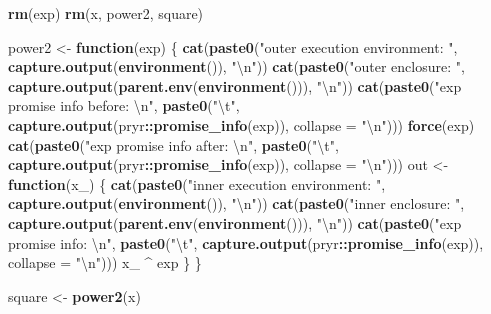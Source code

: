 \documentclass[]{book}
\newenvironment{Shaded}{\begin{snugshade}}{\end{snugshade}}
\newcommand{\CharTok}[1]{\textcolor[rgb]{0.31,0.60,0.02}{#1}}
\newcommand{\ControlFlowTok}[1]{\textcolor[rgb]{0.13,0.29,0.53}{\textbf{#1}}}
\newcommand{\DataTypeTok}[1]{\textcolor[rgb]{0.13,0.29,0.53}{#1}}
\newcommand{\KeywordTok}[1]{\textcolor[rgb]{0.13,0.29,0.53}{\textbf{#1}}}
\newcommand{\NormalTok}[1]{#1}
\newcommand{\OperatorTok}[1]{\textcolor[rgb]{0.81,0.36,0.00}{\textbf{#1}}}
\newcommand{\StringTok}[1]{\textcolor[rgb]{0.31,0.60,0.02}{#1}}
\begin{document}
\begin{Shaded}
\begin{Highlighting}[]
\KeywordTok{rm}\NormalTok{(exp)}
\KeywordTok{rm}\NormalTok{(x, power2, square)}

\NormalTok{power2 <-}\StringTok{ }\ControlFlowTok{function}\NormalTok{(exp) \{}
  \KeywordTok{cat}\NormalTok{(}\KeywordTok{paste0}\NormalTok{(}\StringTok{"outer execution environment: "}\NormalTok{, }\KeywordTok{capture.output}\NormalTok{(}\KeywordTok{environment}\NormalTok{()), }\StringTok{"}\CharTok{\textbackslash{}n}\StringTok{"}\NormalTok{))}
  \KeywordTok{cat}\NormalTok{(}\KeywordTok{paste0}\NormalTok{(}\StringTok{"outer enclosure: "}\NormalTok{, }\KeywordTok{capture.output}\NormalTok{(}\KeywordTok{parent.env}\NormalTok{(}\KeywordTok{environment}\NormalTok{())), }\StringTok{"}\CharTok{\textbackslash{}n}\StringTok{"}\NormalTok{))}
  \KeywordTok{cat}\NormalTok{(}\KeywordTok{paste0}\NormalTok{(}\StringTok{"exp promise info before: }\CharTok{\textbackslash{}n}\StringTok{"}\NormalTok{, }\KeywordTok{paste0}\NormalTok{(}\StringTok{"}\CharTok{\textbackslash{}t}\StringTok{"}\NormalTok{, }\KeywordTok{capture.output}\NormalTok{(pryr}\OperatorTok{::}\KeywordTok{promise_info}\NormalTok{(exp)), }\DataTypeTok{collapse =} \StringTok{"}\CharTok{\textbackslash{}n}\StringTok{"}\NormalTok{)))}
  \KeywordTok{force}\NormalTok{(exp)}
  \KeywordTok{cat}\NormalTok{(}\KeywordTok{paste0}\NormalTok{(}\StringTok{"exp promise info after: }\CharTok{\textbackslash{}n}\StringTok{"}\NormalTok{, }\KeywordTok{paste0}\NormalTok{(}\StringTok{"}\CharTok{\textbackslash{}t}\StringTok{"}\NormalTok{, }\KeywordTok{capture.output}\NormalTok{(pryr}\OperatorTok{::}\KeywordTok{promise_info}\NormalTok{(exp)), }\DataTypeTok{collapse =} \StringTok{"}\CharTok{\textbackslash{}n}\StringTok{"}\NormalTok{)))}
\NormalTok{  out <-}\StringTok{ }\ControlFlowTok{function}\NormalTok{(x_) \{}
    \KeywordTok{cat}\NormalTok{(}\KeywordTok{paste0}\NormalTok{(}\StringTok{"inner execution environment: "}\NormalTok{, }\KeywordTok{capture.output}\NormalTok{(}\KeywordTok{environment}\NormalTok{()), }\StringTok{"}\CharTok{\textbackslash{}n}\StringTok{"}\NormalTok{))}
    \KeywordTok{cat}\NormalTok{(}\KeywordTok{paste0}\NormalTok{(}\StringTok{"inner enclosure: "}\NormalTok{, }\KeywordTok{capture.output}\NormalTok{(}\KeywordTok{parent.env}\NormalTok{(}\KeywordTok{environment}\NormalTok{())), }\StringTok{"}\CharTok{\textbackslash{}n}\StringTok{"}\NormalTok{))}
    \KeywordTok{cat}\NormalTok{(}\KeywordTok{paste0}\NormalTok{(}\StringTok{"exp promise info: }\CharTok{\textbackslash{}n}\StringTok{"}\NormalTok{, }\KeywordTok{paste0}\NormalTok{(}\StringTok{"}\CharTok{\textbackslash{}t}\StringTok{"}\NormalTok{, }\KeywordTok{capture.output}\NormalTok{(pryr}\OperatorTok{::}\KeywordTok{promise_info}\NormalTok{(exp)), }\DataTypeTok{collapse =} \StringTok{"}\CharTok{\textbackslash{}n}\StringTok{"}\NormalTok{)))}
\NormalTok{    x_ }\OperatorTok{^}\StringTok{ }\NormalTok{exp}
\NormalTok{  \}}
\NormalTok{\}}

\NormalTok{square <-}\StringTok{ }\KeywordTok{power2}\NormalTok{(x)}
\end{Highlighting}
\end{Shaded}
\end{document}
